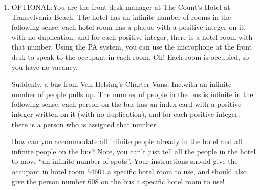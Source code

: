 \documentclass{article}
\begin{document}
\begin{enumerate}
          \begin{proof}
              There are $2^3 = 8$ functions from $A$ to $B$. Here they are:
              \begin{itemize}
                  \item $f_1 = \{(1,4),(2,4),(3,4)\}$
                  \item $f_2 = \{(1,4),(2,4),(3,5)\}$
                  \item $f_3 = \{(1,4),(2,5),(3,4)\}$
                  \item $f_4 = \{(1,4),(2,5),(3,5)\}$
                  \item $f_5 = \{(1,5),(2,4),(3,4)\}$
                  \item $f_6 = \{(1,5),(2,4),(3,5)\}$
                  \item $f_7 = \{(1,5),(2,5),(3,4)\}$
                  \item $f_8 = \{(1,5),(2,5),(3,5)\}$
              \end{itemize}
          \end{proof}

          \newpage

    \item OPTIONAL:\@ You are the front desk manager at The Count's Hotel at Transylvania
          Beach. The hotel has an infinite number of rooms in the following sense: each
          hotel room has a plaque with a positive integer on it, with no duplication, and
          for each positive integer, there is a hotel room with that number. Using the PA
          system, you can use the microphone at the front desk to speak to the occupant
          in each room. Oh! Each room is occupied, so you have no vacancy.

          Suddenly, a bus from Van Helsing's Charter Vans, Inc.\@ with an infinite number
          of people pulls up. The number of people in the bus is infinite in the
          following sense: each person on the bus has an index card with a positive
          integer written on it (with no duplication), and for each positive integer,
          there is a person who is assigned that number.

          How can you accommodate all infinite people already in the hotel and all
          infinite people on the bus? Note, you can't just tell all the people in the
          hotel to move ``an infinite number of spots''. Your instructions should give
          the occupant in hotel room $54601$ a specific hotel room to use, and should
          also give the person number $608$ on the bus a specific hotel room to use!


\end{enumerate}
\end{document}

